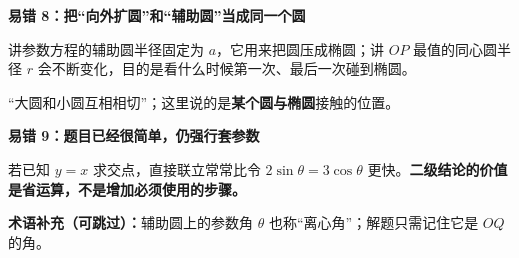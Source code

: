 \begin{trapbox}
\medskip
\textbf{\textcolor{CTrap}{易错 8：把“向外扩圆”和“辅助圆”当成同一个圆}}
\begin{description}[style=nextline,leftmargin=2.8em,labelsep=0.5em,itemsep=0.35em]
\item[\textbf{区别：}] 讲参数方程的辅助圆半径固定为 $a$，它用来把圆压成椭圆；讲 $OP$ 最值的同心圆半径 $r$ 会不断变化，目的是看什么时候第一次、最后一次碰到椭圆。
\item[\textbf{不是：}] “大圆和小圆互相相切”；这里说的是\textbf{某个圆与椭圆}接触的位置。
\end{description}

\medskip
\par\noindent\begin{minipage}{\linewidth}
\textbf{\textcolor{CTrap}{易错 9：题目已经很简单，仍强行套参数}}
\begin{description}[style=nextline,leftmargin=2.8em,labelsep=0.5em,itemsep=0.35em]
\item[\textbf{先做选择：}] 若已知 $y=x$ 求交点，直接联立常常比令 $2\sin\theta=3\cos\theta$ 更快。\textbf{二级结论的价值是省运算，不是增加必须使用的步骤。}
\end{description}
\end{minipage}\par
\medskip
\textbf{术语补充（可跳过）：}辅助圆上的参数角 $\theta$ 也称“离心角”；解题只需记住它是 $OQ$ 的角。
\end{trapbox}
